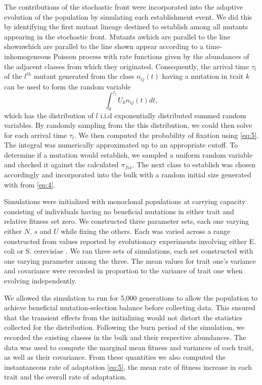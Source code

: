 \documentclass[11pt,twocolumn]{article}
\begin{document}
The contributions of the stochastic front were incorporated into the adaptive evolution of the population by simulating each establishment event. We did this by identifying the first mutant lineage destined to establish among all mutants appearing in the stochastic front. Mutants awhich are parallel to the line shownwhich are parallel to the line shown appear according to a time-inhomogeneous Poisson process with rate functions given by the abundances of the adjacent classes from which they originated. Consequently, the arrival time $\tau_l$ of the $l^{th}$ mutant generated from the class $n_{ij}(t)$ having a mutation in trait $k$ can be used to form the random variable
% 
% 
\[ 
\int_0^{\tau_l} U_k n_{ij}(t) dt ,
\] 
which has the distribution of $l$ i.i.d exponentially distributed summed random variables. By randomly sampling from the this distribution, we could then solve for each arrival time $\tau_l$. We then computed the probability of fixation using \eqref{eq:5}. The integral was numerically approximated up to an appropriate cutoff.  To determine if a mutation would establish, we sampled a uniform random variable and checked it against the calculated $\pi_{fix}$. The next class to establish was chosen accordingly and incorporated into the bulk with a random initial size generated with from \eqref{eq:4}.\par
% 
% 

Simulations were initialized with monoclonal populations at carrying capacity consisting of individuals having no beneficial mutations in either trait and relative fitness set zero. We constructed three parameter sets, each one varying either $N$, $s$ and $U$ while fixing the others. Each was varied across a range constructed from values reported by evolutionary experiments involving either E. coli or S. cerevisiae \citep{desai2007speed,Levy2015,Perfeito2007}. We ran three sets of simulations, each set constructed with one varying parameter among the three. The mean values for trait one's variance and covariance were recorded in proportion to the variance of trait one when evolving independently.  

We allowed the simulation to run for 5,000 generations to allow the population to achieve beneficial mutation-selection balance before collecting data. This ensured that the transient effects from the initializing would not distort the statistics collected for the distribution. Following the burn period of the simulation, we recorded the existing classes in the bulk and their respective abundances. The data was used to compute the marginal mean fitness and variances of each trait, as well as their covariance. From these quantities we also computed the instantaneous rate of adaptation \eqref{eq:5}, the mean rate of fitness increase in each trait and the overall rate of adaptation.
\end{document}
